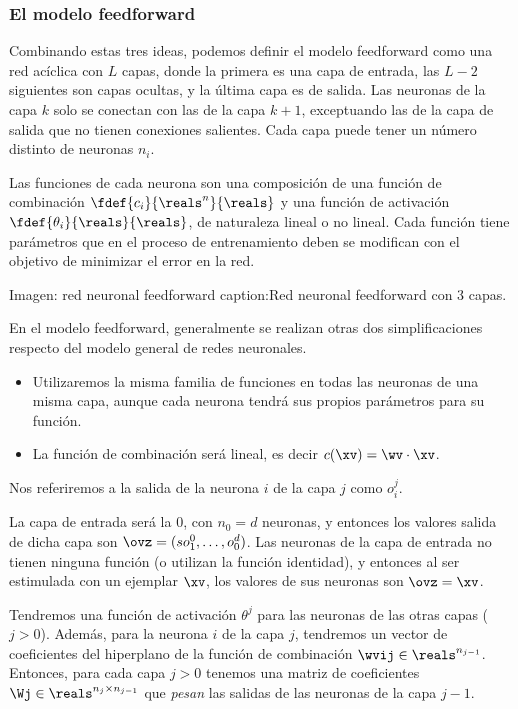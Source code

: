 \subsubsection{El modelo feedforward}

Combinando estas tres ideas, podemos definir el modelo feedforward como una red acíclica con $L$ capas, donde la primera es una capa de entrada, las $L-2$ siguientes son capas ocultas, y la última capa es de salida. Las neuronas de la capa $k$ solo se conectan con las de la capa $k+1$, exceptuando las de la capa de salida que no tienen conexiones salientes. Cada capa puede tener un número distinto de neuronas $n_i$. 

Las funciones de cada neurona son una composición de una función de combinación $\fdef{c_i}{\reals^n}{\reals}$ y una función de activación $\fdef{\theta_i}{\reals}{\reals}$, de naturaleza lineal o no lineal. Cada función tiene parámetros que en el proceso de entrenamiento deben se modifican con el objetivo de  minimizar el error en la red. 

Imagen: red neuronal feedforward
caption:Red neuronal feedforward con 3 capas.

En el modelo feedforward, generalmente se realizan otras dos simplificaciones respecto del modelo general de redes neuronales.

\begin{itemize}
\item Utilizaremos la misma familia de funciones en todas las neuronas de una misma capa, aunque cada neurona tendrá sus propios parámetros para su función. 

\item La función de combinación será lineal, es decir $c(\xv)= \wv \cdot \xv$.
\end{itemize}


Nos referiremos a la salida de la neurona $i$ de la capa $j$ como $o_i^j$. 

La capa de entrada será la $0$, con $n_0=d$ neuronas, y entonces los valores salida de dicha capa son $\ovz=(so_1^0,\dots,o_0^d)$. Las neuronas de la capa de entrada no tienen ninguna función (o utilizan la función identidad), y entonces al ser estimulada con un ejemplar $\xv$, los valores de sus neuronas son $\ovz=\xv$.

Tendremos una función de activación $\theta^j$ para las neuronas de las otras capas ($j>0$). Además, para la neurona $i$ de la capa $j$, tendremos un vector de coeficientes del hiperplano de la función de combinación $\wvij \in \reals^{n_{j-1}}$. Entonces, para cada capa $j>0$ tenemos una matriz de coeficientes $\Wj \in \reals^{n_j \times n_{j-1}}$ que \textit{pesan} las salidas de las neuronas de la capa $j-1$.


